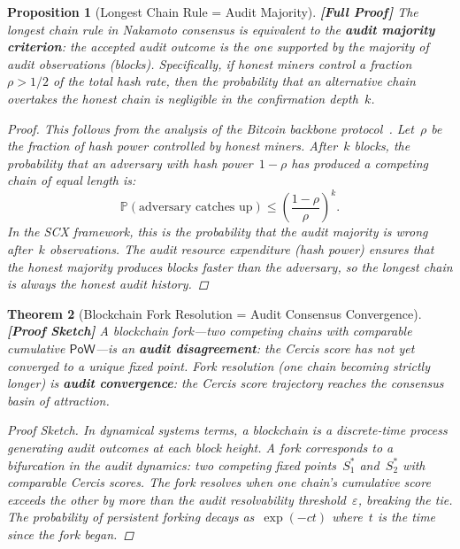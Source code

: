 \documentclass[12pt,a4paper]{article}
\newtheorem{theorem}{Theorem}[section]
\newtheorem{proposition}[theorem]{Proposition}
\theoremstyle{remark}
\newcommand{\Pbb}{\mathbb{P}}
\newcommand{\SCX}{\textsf{SCX}}
\newcommand{\Cercis}{\textsf{Cercis}}
\newcommand{\PoW}{\textsf{PoW}}
\newcommand{\rigorFull}{\textbf{[Full Proof]}}
\newcommand{\rigorSketch}{\textbf{[Proof Sketch]}}
\begin{document}
\begin{proposition}[Longest Chain Rule = Audit Majority]
\label{prop:longest_chain_majority}
\rigorFull
The longest chain rule in Nakamoto consensus is equivalent to the \textbf{audit majority criterion}: the accepted audit outcome is the one supported by the majority of audit observations (blocks). Specifically, if honest miners control a fraction~$\rho > 1/2$ of the total hash rate, then the probability that an alternative chain overtakes the honest chain is negligible in the confirmation depth~$k$.

\begin{proof}
This follows from the analysis of the Bitcoin backbone protocol~\cite{garay2015bitcoin}. Let~$\rho$ be the fraction of hash power controlled by honest miners. After~$k$ blocks, the probability that an adversary with hash power~$1-\rho$ has produced a competing chain of equal length is:
\begin{equation}
  \Pbb(\text{adversary catches up}) \leq \left(\frac{1-\rho}{\rho}\right)^k.
\end{equation}
In the \SCX{} framework, this is the probability that the audit majority is wrong after~$k$ observations. The audit resource expenditure (hash power) ensures that the honest majority produces blocks faster than the adversary, so the longest chain is always the honest audit history.
\end{proof}
\end{proposition}

\begin{theorem}[Blockchain Fork Resolution = Audit Consensus Convergence]
\label{thm:fork_resolution}
\rigorSketch
A blockchain fork---two competing chains with comparable cumulative $\PoW$---is an \textbf{audit disagreement}: the \Cercis{} score has not yet converged to a unique fixed point. Fork resolution (one chain becoming strictly longer) is \textbf{audit convergence}: the \Cercis{} score trajectory reaches the consensus basin of attraction.

\begin{proof}[Proof Sketch]
In dynamical systems terms, a blockchain is a discrete-time process generating audit outcomes at each block height. A fork corresponds to a bifurcation in the audit dynamics: two competing fixed points~$S_1^*$ and~$S_2^*$ with comparable \Cercis{} scores. The fork resolves when one chain's cumulative score exceeds the other by more than the audit resolvability threshold~$\varepsilon$, breaking the tie. The probability of persistent forking decays as~$\exp(-ct)$ where~$t$ is the time since the fork began.
\end{proof}
\end{theorem}
\end{document}
